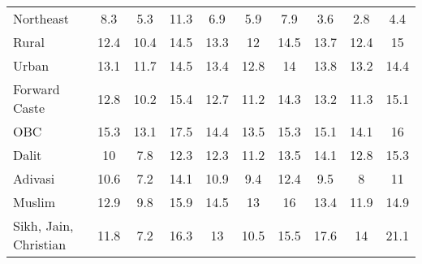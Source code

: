 \begin{tabular}{l*{9}{c}}
Northeast           &         8.3&         5.3&        11.3&         6.9&         5.9&         7.9&         3.6&         2.8&         4.4\\
Rural               &        12.4&        10.4&        14.5&        13.3&          12&        14.5&        13.7&        12.4&          15\\
Urban               &        13.1&        11.7&        14.5&        13.4&        12.8&          14&        13.8&        13.2&        14.4\\
Forward Caste       &        12.8&        10.2&        15.4&        12.7&        11.2&        14.3&        13.2&        11.3&        15.1\\
OBC                 &        15.3&        13.1&        17.5&        14.4&        13.5&        15.3&        15.1&        14.1&          16\\
Dalit               &          10&         7.8&        12.3&        12.3&        11.2&        13.5&        14.1&        12.8&        15.3\\
Adivasi             &        10.6&         7.2&        14.1&        10.9&         9.4&        12.4&         9.5&           8&          11\\
Muslim              &        12.9&         9.8&        15.9&        14.5&          13&          16&        13.4&        11.9&        14.9\\
Sikh, Jain, Christian&        11.8&         7.2&        16.3&          13&        10.5&        15.5&        17.6&          14&        21.1\\
\bottomrule
\end{tabular}
